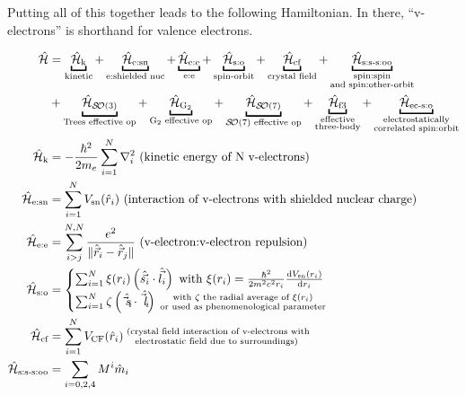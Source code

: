 \documentclass{article}
\begin{document}
Putting all of this together leads to the following Hamiltonian. In there, ``v-electrons'' is shorthand for valence electrons.

\begin{align}
	\ham &= \underbracket{\hamKineticSymbol}_{\text{kinetic}}
		 + \underbracket{\hamNuclearCoulombSymbol}_{\text{e:shielded nuc}}
		 + \underbracket{\hamCoulombEESymbol}_{\text{e:e}}
		 + \underbracket{\hamSpinOrbitSymbol}_{\text{spin-orbit}}
		 + \underbracket{\hamCrystalFieldSymbol}_{\text{crystal field}}
		 + \underbracket{\hamSpinSpinSpinOtherOrbitSymbol}_{
		 			\substack{
		 				\text{spin:spin} \\ 
		 				\text{and spin:other-orbit}
		 				}
		 			} \\
		 & + \underbracket{\hamTreesSymbol}_\text{Trees effective op} 
		 + \underbracket{\hamGTwoSymbol}_\text{G${}_2$ effective op} 
		 + \underbracket{\hamSOSevenSymbol}_\text{$\SO{7}$ effective op} 
		 + \underbracket{\ham_\text{f3}}_{\substack{
		 \text{effective} \\
		 \text{three-body}}} 
		 + \underbracket{\hamECSOSymbol}_{
		 		\substack{
		 			\text{electrostatically} \\
		 			\text{correlated spin:orbit}
		 			}
		 			} \\
	\hamKineticSymbol &= -\frac{\hbar^2}{2m_e}\sum_{i=1}^N \nabla_i^2 \text{ (kinetic energy of N v-electrons)}\\
	\hamNuclearCoulombSymbol &= \hamNuclearCoulomb \text{ (interaction of v-electrons with shielded nuclear charge)} \\
	\ham_\text{e:e} &= \hamCoulombEE \text{ (v-electron:v-electron repulsion)} \\
	\hamSpinOrbitSymbol &= \begin{cases} 
			\hamSpinOrbit \text{ with } \xi{(r_i)} = \frac{\hbar^2}{2 m^2 c^2 r_i} \frac{\diff{V_\text{sn}(r_i)}}{\diff{r_i}} \\
			\sum_{i=1}^N \zeta \paren{\op{\vec{s}_i} \cdot \op{\vec{l}_i}} {{\substack{
						\text{ with $\zeta$ the radial average of $\xi(r_i)$} \\ 
						\text{ or used as phenomenological parameter}
						}
					}}
			\end{cases} \\
	\hamCrystalFieldSymbol &= \hamCrystalField {
		\substack{
			\text{ (crystal field interaction of v-electrons with} \\
			\text{electrostatic field due to surroundings)}
			}
			}\\
	\hamSpinSpinSpinOtherOrbitSymbol &= \hamSpinSpinSpinOtherOrbit \\

\end{align}
\end{document}
